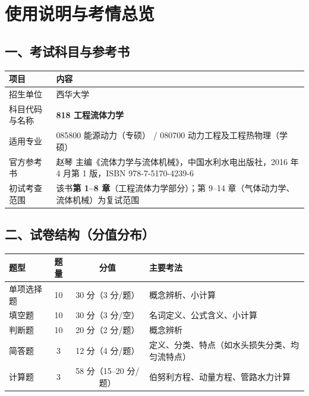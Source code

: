 \chapter*{使用说明与考情总览}

\section*{一、考试科目与参考书}

\begin{center}
\begin{tabularx}{\textwidth}{@{}lX@{}}
\toprule
项目 & 内容 \\
\midrule
招生单位 & 西华大学 \\
科目代码与名称 & \textbf{818 工程流体力学} \\
适用专业 & 085800 能源动力（专硕） / 080700 动力工程及工程热物理（学硕） \\
官方参考书 & 赵琴 主编《流体力学与流体机械》，中国水利水电出版社，2016 年 4 月第 1 版，ISBN 978-7-5170-4239-6 \\
初试考查范围 & 该书\textbf{第 1--8 章}（工程流体力学部分）；第 9--14 章（气体动力学、流体机械）为复试范围 \\
\bottomrule
\end{tabularx}
\end{center}

\section*{二、试卷结构（分值分布）}

\begin{center}
\begin{tabularx}{\textwidth}{@{}lccX@{}}
\toprule
题型 & 题量 & 分值 & 主要考法 \\
\midrule
单项选择题 & 10 & 30 分（3 分/题） & 概念辨析、小计算 \\
填空题 & 10 & 30 分（3 分/空） & 名词定义、公式含义、小计算 \\
判断题 & 10 & 20 分（2 分/题） & 概念辨析 \\
简答题 & 3 & 12 分（4 分/题） & 定义、分类、特点（如水头损失分类、均匀流特点） \\
计算题 & 3 & 58 分（15--20 分/题） & 伯努利方程、动量方程、管路水力计算 \\
\bottomrule
\end{tabularx}
\end{center}


